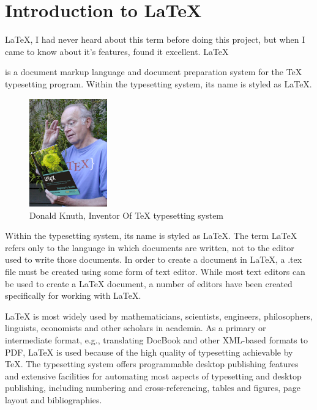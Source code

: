
\section{Introduction to \LaTeX}

\LaTeX, I had never heard about this term before doing this project,
but when I came to know about it's features, found it excellent. 
\LaTeX{ is a document markup language and document preparation system for the \TeX{} 
typesetting program. Within the typesetting system, its name is styled 
as \LaTeX.

\begin{figure}[!ht]
\centering
\includegraphics[width=0.3\textwidth]{input/images/donald.png}                   
\caption{Donald Knuth, Inventor Of \TeX{} 
typesetting system}
\hspace{-1.5em}
\end{figure}

Within the typesetting system, its name is styled as \LaTeX. The term 
\LaTeX{} refers only to the language in which documents are written, 
not to the editor used to write those documents. In order to create a 
document in \LaTeX, a .tex file must be created using some form of text 
editor. While most text editors can be used to create a \LaTeX{} document, 
a number of editors have been created specifically for working with \LaTeX.

\LaTeX{} is most widely used by mathematicians, scientists, 
engineers, philosophers, linguists, economists and other scholars in 
academia. As a primary or intermediate format, e.g., translating DocBook 
and other XML-based formats to PDF, \LaTeX{} is used because of the 
high quality of typesetting achievable by \TeX. The typesetting system 
offers programmable desktop publishing features and extensive facilities 
for automating most aspects of typesetting and desktop publishing, 
including numbering and cross-referencing, tables and figures, 
page layout and bibliographies.

}
